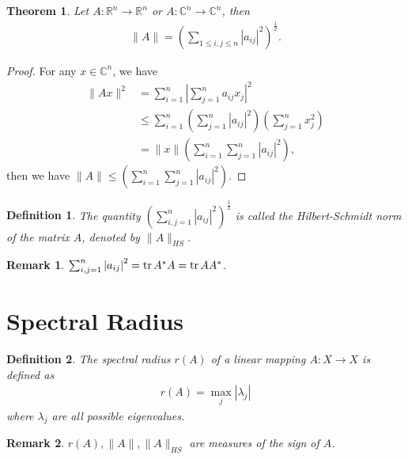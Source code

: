 \documentclass[11pt]{book}
\newtheorem{definition}{Definition}[section]
\newtheorem{theorem}{Theorem}[section]
\newtheorem{remark}{Remark}[section]
\theoremstyle{definition}
\numberwithin{equation}{chapter}
\begin{document}
\medskip

\begin{theorem}
Let $A:\mathbb{R}^n \to \mathbb{R}^n$ or $A:\mathbb{C}^n \to \mathbb{C}^n$, then 
\begin{align*}
    \|A\| = \left(\sum_{1\leq i,j\leq n} \left|a_{ij}\right|^2\right)^{\frac{1}{2}}.
\end{align*}
\end{theorem}
\begin{proof}
For any $x\in \mathbb{C}^n$, we have
\begin{align*}
    \|Ax\|^2 & = \sum^n_{i=1} \left|\sum^n_{j=1}a_{ij} x_j\right|^2 \\
    & \leq \sum^n_{i=1} \left(\sum^n_{j=1}\left|a_{ij}\right|^2 \right) \left(\sum^n_{j=1} x_j^2 \right) \\
    & = \|x\| \left(\sum^n_{i=1}\sum^n_{j=1}\left|a_{ij}\right|^2 \right),
\end{align*}
then we have $\|A\|\leq \left(\sum^n_{i=1}\sum^n_{j=1}\left|a_{ij}\right|^2 \right)$.
\end{proof}

\begin{definition}
The quantity $\left(\sum^n_{i,j=1}\left|a_{ij}\right|^2 \right)^{\frac{1}{2}}$ is called the Hilbert-Schmidt norm of the matrix $A$, denoted by $\|A\|_{HS}$. 
\end{definition}

\begin{remark}
$\sum^n_{i,j=1}\left|a_{ij}\right|^2 = \tr A^*A = \tr AA^*$.
\end{remark}

\medskip

\section{Spectral Radius}

\begin{definition}
The spectral radius $r(A)$ of a linear mapping $A:X\to X$ is defined as
\begin{align*}
    r(A) = \max_{j} \left|\lambda_j \right|
\end{align*}
where $\lambda_j$ are all possible eigenvalues.
\end{definition}

\begin{remark}
$r(A), \|A\|, \|A\|_{HS}$ are measures of the sign of $A$.
\end{remark}

\medskip
\end{document}
